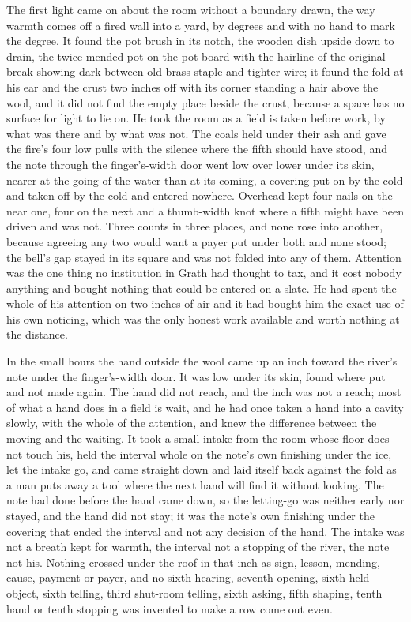 \scenebreak

The first light came on about the room without a boundary drawn, the way warmth comes off a fired wall into a yard, by degrees and with no hand to mark the degree. It found the pot brush in its notch, the wooden dish upside down to drain, the twice-mended pot on the pot board with the hairline of the original break showing dark between old-brass staple and tighter wire; it found the fold at his ear and the crust two inches off with its corner standing a hair above the wool, and it did not find the empty place beside the crust, because a space has no surface for light to lie on. He took the room as a field is taken before work, by what was there and by what was not. The coals held under their ash and gave the fire's four low pulls with the silence where the fifth should have stood, and the note through the finger's-width door went low over lower under its skin, nearer at the going of the water than at its coming, a covering put on by the cold and taken off by the cold and entered nowhere. Overhead  kept four nails on the near one, four on the next and a thumb-width knot where a fifth might have been driven and was not. Three counts in three places, and none rose into another, because agreeing any two would want a payer put under both and none stood; the bell's gap stayed in its square and was not folded into any of them. Attention was the one thing no institution in Grath had thought to tax, and it cost nobody anything and bought nothing that could be entered on a slate. He had spent the whole of his attention on two inches of air and it had bought him the exact use of his own noticing, which was the only honest work available and worth nothing at the distance.

In the small hours the hand outside the wool came up an inch toward the river's note under the finger's-width door. It was low under its skin, found where put and not made again. The hand did not reach, and the inch was not a reach; most of what a hand does in a field is wait, and he had once taken a hand into a cavity slowly, with the whole of the attention, and knew the difference between the moving and the waiting. It took a small intake from the room whose floor does not touch his, held the interval whole on the note's own finishing under the ice, let the intake go, and came straight down and laid itself back against the fold as a man puts away a tool where the next hand will find it without looking. The note had done before the hand came down, so the letting-go was neither early nor stayed, and the hand did not stay; it was the note's own finishing under the covering that ended the interval and not any decision of the hand. The intake was not a breath kept for warmth, the interval not a stopping of the river, the note not his. Nothing crossed under the roof in that inch as sign, lesson, mending, cause, payment or payer, and no sixth hearing, seventh opening, sixth held object, sixth telling, third shut-room telling, sixth asking, fifth shaping, tenth hand or tenth stopping was invented to make a row come out even.

